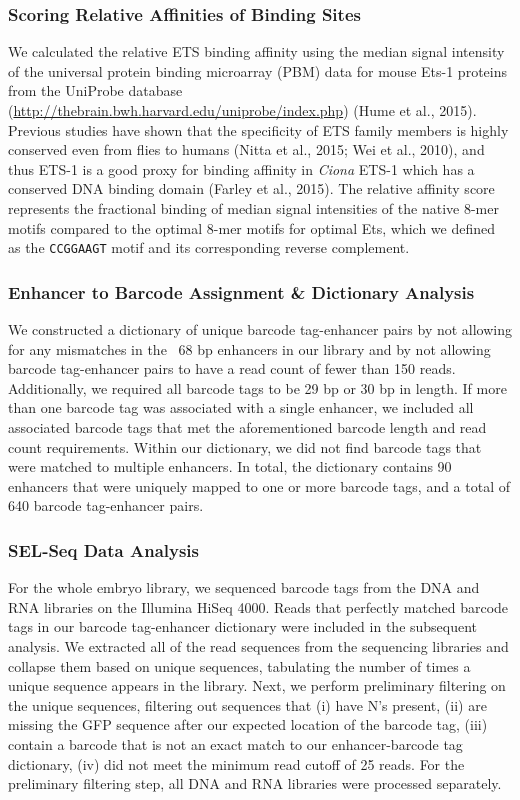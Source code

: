 \subsubsection{Scoring Relative Affinities of Binding Sites}
We calculated the relative ETS binding affinity using the median signal intensity of the universal protein binding microarray (PBM) data for mouse Ets-1 proteins from the UniProbe database (\href{http://thebrain.bwh.harvard.edu/uniprobe/index.php}{http://thebrain.bwh.harvard.edu/uniprobe/index.php}) (Hume et al., 2015). Previous studies have shown that the specificity of ETS family members is highly conserved even from flies to humans (Nitta et al., 2015; Wei et al., 2010), and thus ETS-1 is a good proxy for binding affinity in \textit{Ciona} ETS-1 which has a conserved DNA binding domain (Farley et al., 2015). The relative affinity score represents the fractional binding of median signal intensities of the native 8-mer motifs compared to the optimal 8-mer motifs for optimal Ets, which we defined as the \verb|CCGGAAGT| motif and its corresponding reverse complement.  

\subsubsection{Enhancer to Barcode Assignment \& Dictionary Analysis}
We constructed a dictionary of unique barcode tag-enhancer pairs by not allowing for any mismatches in the ~68 bp enhancers in our library and by not allowing barcode tag-enhancer pairs to have a read count of fewer than 150 reads. Additionally, we required all barcode tags to be 29 bp or 30 bp in length. If more than one barcode tag was associated with a single enhancer, we included all associated barcode tags that met the aforementioned barcode length and read count requirements. Within our dictionary, we did not find barcode tags that were matched to multiple enhancers. In total, the dictionary contains 90 enhancers that were uniquely mapped to one or more barcode tags, and a total of 640 barcode tag-enhancer pairs.

\subsubsection{SEL-Seq Data Analysis}
For the whole embryo library, we sequenced barcode tags from the DNA and RNA libraries on the Illumina HiSeq 4000. Reads that perfectly matched barcode tags in our barcode tag-enhancer dictionary were included in the subsequent analysis.
We extracted all of the read sequences from the sequencing libraries and collapse them based on unique sequences, tabulating the number of times a unique sequence appears in the library. Next, we perform preliminary filtering on the unique sequences, filtering out sequences that (i) have N’s present, (ii) are missing the GFP sequence after our expected location of the barcode tag, (iii) contain a barcode that is not an exact match to our enhancer-barcode tag dictionary, (iv) did not meet the minimum read cutoff of 25 reads. For the preliminary filtering step, all DNA and RNA libraries were processed separately. 

